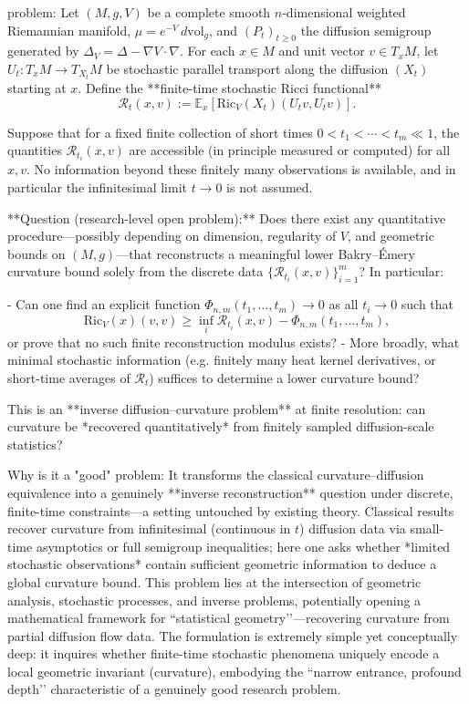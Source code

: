 problem:  
Let \((M,g,V)\) be a complete smooth \(n\)-dimensional weighted Riemannian manifold, \(\mu=e^{-V}\,d\mathrm{vol}_g\), and \((P_t)_{t\ge0}\) the diffusion semigroup generated by \(\Delta_V=\Delta-\nabla V\cdot\nabla\).  
For each \(x\in M\) and unit vector \(v\in T_xM\), let \(U_t\colon T_xM\to T_{X_t}M\) be stochastic parallel transport along the diffusion \((X_t)\) starting at \(x\).  
Define the **finite-time stochastic Ricci functional**
\[
\mathcal{R}_t(x,v):=\mathbb{E}_x[\mathrm{Ric}_V(X_t)(U_t v,U_t v)].
\]

Suppose that for a fixed finite collection of short times \(0<t_1<\cdots<t_m \ll1\), the quantities \(\mathcal{R}_{t_i}(x,v)\) are accessible (in principle measured or computed) for all \(x,v\).  
No information beyond these finitely many observations is available, and in particular the infinitesimal limit \(t\to0\) is not assumed.

**Question (research-level open problem):**  
Does there exist any quantitative procedure—possibly depending on dimension, regularity of \(V\), and geometric bounds on \((M,g)\)—that reconstructs a meaningful lower Bakry–Émery curvature bound solely from the discrete data \(\{\mathcal{R}_{t_i}(x,v)\}_{i=1}^{m}\)?  In particular:

- Can one find an explicit function \(\Phi_{n,m}(t_1,\dots,t_m)\to0\) as all \(t_i\to0\) such that
  \[
  \mathrm{Ric}_V(x)(v,v)\ge
     \inf_i \mathcal{R}_{t_i}(x,v)-\Phi_{n,m}(t_1,\dots,t_m),
  \]
  or prove that no such finite reconstruction modulus exists?  
- More broadly, what minimal stochastic information (e.g. finitely many heat kernel derivatives, or short-time averages of \(\mathcal R_t\)) suffices to determine a lower curvature bound?

This is an **inverse diffusion–curvature problem** at finite resolution: can curvature be *recovered quantitatively* from finitely sampled diffusion-scale statistics?

Why is it a "good" problem:  
It transforms the classical curvature–diffusion equivalence into a genuinely **inverse reconstruction** question under discrete, finite-time constraints—a setting untouched by existing theory.  Classical results recover curvature from infinitesimal (continuous in \(t\)) diffusion data via small-time asymptotics or full semigroup inequalities; here one asks whether *limited stochastic observations* contain sufficient geometric information to deduce a global curvature bound.  
This problem lies at the intersection of geometric analysis, stochastic processes, and inverse problems, potentially opening a mathematical framework for “statistical geometry’’—recovering curvature from partial diffusion flow data.  
The formulation is extremely simple yet conceptually deep: it inquires whether finite-time stochastic phenomena uniquely encode a local geometric invariant (curvature), embodying the “narrow entrance, profound depth’’ characteristic of a genuinely good research problem.